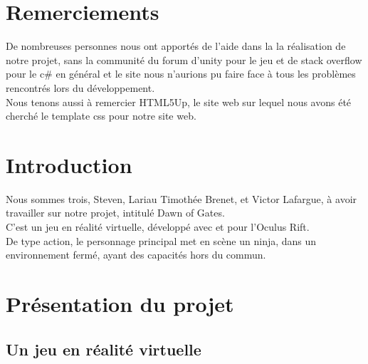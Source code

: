 \documentclass[12pt]{article}
\begin{document}
\newpage

\section*{Remerciements}

De nombreuses personnes nous ont apportés de l'aide dans la la réalisation de notre projet, sans la communité du forum d'unity pour le jeu et de stack overflow pour le c\# en général et le site nous n'aurions pu faire face à tous les problèmes rencontrés lors du développement.\\
Nous tenons aussi à remercier HTML5Up, le site web sur lequel nous avons été cherché le template css pour notre site web.

\newpage

\section*{Introduction}

Nous sommes trois, Steven, Lariau Timothée Brenet, et Victor Lafargue, à avoir travailler sur notre projet, intitulé Dawn of Gates.\\
C'est un jeu en réalité virtuelle, développé avec et pour l'Oculus Rift.\\
De type action, le personnage principal met en scène un ninja, dans un environnement fermé, ayant des capacités hors du commun.

\newpage

\renewcommand{\contentsname}{Sommaire}
\tableofcontents

\newpage

\section{Présentation du projet}

\subsection{Un jeu en réalité virtuelle}
\end{document}
